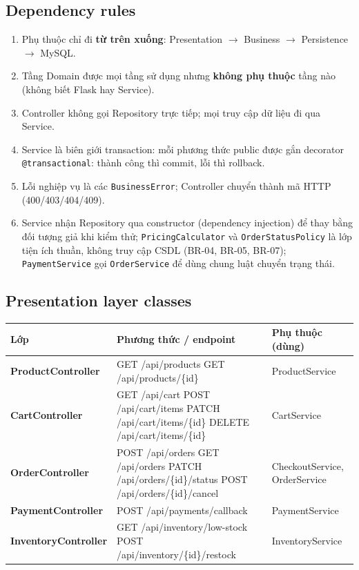 \documentclass[12pt,a4paper,oneside]{report}
\begin{document}
\subsection{Dependency rules}
\begin{enumerate}\item Phụ thuộc chỉ đi \textbf{từ trên xuống}: Presentation $\to$ Business $\to$ Persistence $\to$ MySQL.\item Tầng Domain được mọi tầng sử dụng nhưng \textbf{không phụ thuộc} tầng nào (không biết Flask hay Service).\item Controller không gọi Repository trực tiếp; mọi truy cập dữ liệu đi qua Service.\item Service là biên giới transaction: mỗi phương thức public được gắn decorator \texttt{@transactional}: thành công thì commit, lỗi thì rollback.\item Lỗi nghiệp vụ là các \texttt{BusinessError}; Controller chuyển thành mã HTTP (400/403/404/409).\item Service nhận Repository qua constructor (dependency injection) để thay bằng đối tượng giả khi kiểm thử; \texttt{PricingCalculator} và \texttt{OrderStatusPolicy} là lớp tiện ích thuần, không truy cập CSDL (BR-04, BR-05, BR-07); \texttt{PaymentService} gọi \texttt{OrderService} để dùng chung luật chuyển trạng thái.\end{enumerate}
\subsection{Presentation layer classes}
\begin{longtable}{@{}>{\raggedright\arraybackslash\small\bfseries}p{3.4cm}>{\raggedright\arraybackslash\ttfamily\footnotesize}p{7.2cm}>{\raggedright\arraybackslash\footnotesize}p{4.6cm}@{}}\toprule Lớp & Phương thức / endpoint & Phụ thuộc (dùng)\\\midrule\endhead
ProductController & GET /api/products \newline GET /api/products/\{id\} & ProductService\\\midrule
CartController & GET /api/cart \newline POST /api/cart/items \newline PATCH /api/cart/items/\{id\} \newline DELETE /api/cart/items/\{id\} & CartService\\\midrule
OrderController & POST /api/orders \newline GET /api/orders \newline PATCH /api/orders/\{id\}/status \newline POST /api/orders/\{id\}/cancel & CheckoutService, OrderService\\\midrule
PaymentController & POST /api/payments/callback & PaymentService\\\midrule
InventoryController & GET /api/inventory/low-stock \newline POST /api/inventory/\{id\}/restock & InventoryService\\\midrule
\bottomrule\end{longtable}
\end{document}
